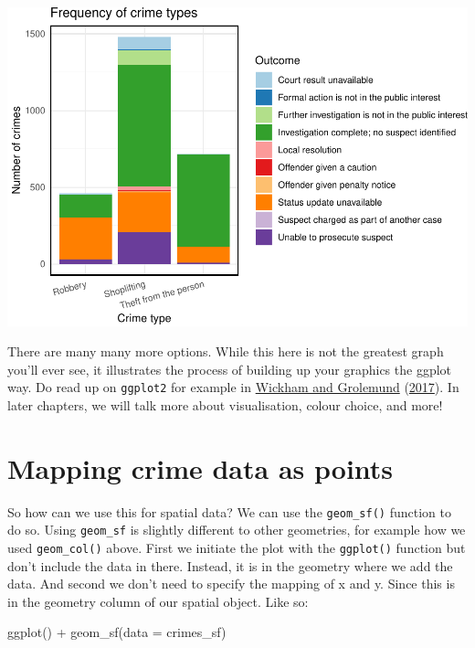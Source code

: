 \documentclass[
]{book}
\makeatletter
\newenvironment{Shaded}{\begin{snugshade}}{\end{snugshade}}
\newcommand{\AttributeTok}[1]{\textcolor[rgb]{0.61,0.61,0.61}{#1}}
\newcommand{\FunctionTok}[1]{\textcolor[rgb]{0,0,0}{#1}}
\newcommand{\NormalTok}[1]{#1}
\newcommand{\SpecialCharTok}[1]{\textcolor[rgb]{0,0,0}{#1}}
\newenvironment{kframe}{%
\medskip{}
\setlength{\fboxsep}{.8em}
 \def\at@end@of@kframe{}%
 \ifinner\ifhmode%
  \def\at@end@of@kframe{\end{minipage}}%
  \begin{minipage}{\columnwidth}%
 \fi\fi%
 \def\FrameCommand##1{\hskip\@totalleftmargin \hskip-\fboxsep
 \colorbox{shadecolor}{##1}\hskip-\fboxsep
     \hskip-\linewidth \hskip-\@totalleftmargin \hskip\columnwidth}%
 \MakeFramed {\advance\hsize-\width
   \@totalleftmargin\z@ \linewidth\hsize
   \@setminipage}}%
 {\par\unskip\endMakeFramed%
 \at@end@of@kframe}
\renewenvironment{Shaded}{\begin{kframe}}{\end{kframe}}
\makeatother
\begin{document}
\includegraphics{crime_mapping_files/figure-latex/unnamed-chunk-13-1.pdf}

There are many many more options. While this here is not the greatest graph you'll ever see, it illustrates the process of building up your graphics the ggplot way. Do read up on \texttt{ggplot2} for example in \protect\hyperlink{ref-Wickham_2017}{Wickham and Grolemund} (\protect\hyperlink{ref-Wickham_2017}{2017}). In later chapters, we will talk more about visualisation, colour choice, and more!

\hypertarget{mapping-crime-data-as-points}{%
\section{Mapping crime data as points}\label{mapping-crime-data-as-points}}

So how can we use this for spatial data? We can use the \texttt{geom\_sf()} function to do so. Using \texttt{geom\_sf} is slightly different to other geometries, for example how we used \texttt{geom\_col()} above. First we initiate the plot with the \texttt{ggplot()} function but don't include the data in there. Instead, it is in the geometry where we add the data. And second we don't need to specify the mapping of x and y. Since this is in the geometry column of our spatial object. Like so:

\begin{Shaded}
\begin{Highlighting}[]
\FunctionTok{ggplot}\NormalTok{() }\SpecialCharTok{+} 
  \FunctionTok{geom\_sf}\NormalTok{(}\AttributeTok{data =}\NormalTok{ crimes\_sf)}
\end{Highlighting}
\end{Shaded}
\end{document}
